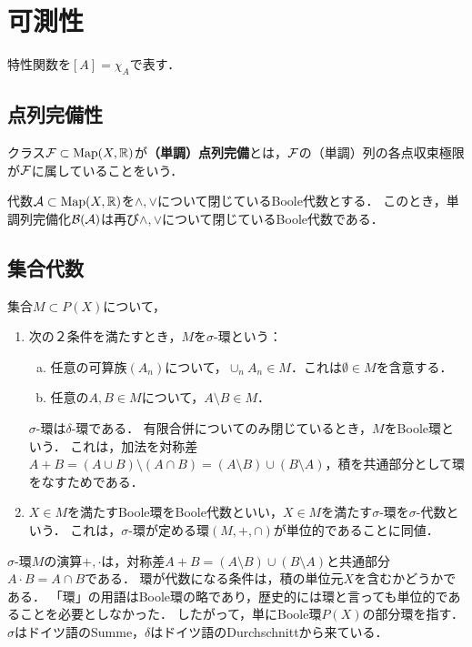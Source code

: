 \documentclass[uplatex,dvipdfmx]{jsreport}
\begin{document}
\section{可測性}

\begin{notation}
    特性関数を$[A]=\chi_A$で表す．
\end{notation}

\subsection{点列完備性}

\begin{definition}
    クラス$\mathcal{F}\subset\mathrm{Map}(X,\mathbb{R})$が\textbf{（単調）点列完備}とは，$\mathcal{F}$の（単調）列の各点収束極限が$\mathcal{F}$に属していることをいう．
\end{definition}

\begin{lemma}\label{lemma-sequential-completion}
    代数$\mathcal{A}\subset\mathrm{Map}(X,\mathbb{R})$を$\land,\lor$について閉じているBoole代数とする．
    このとき，単調列完備化$\mathcal{B}(\mathcal{A})$は再び$\land,\lor$について閉じているBoole代数である．
\end{lemma}

\subsection{集合代数}

\begin{definition}
    集合$M\subset P(X)$について，
    \begin{enumerate}
        \item 次の２条件を満たすとき，$M$を$\sigma$-環という：
        \begin{enumerate}[(a)]
            \item 任意の可算族$(A_n)$について，$\cup_{n}A_n\in M$．これは$\emptyset\in M$を含意する．
            \item 任意の$A,B\in M$について，$A\setminus B\in M$．
        \end{enumerate}
        $\sigma$-環は$\delta$-環である．
        有限合併についてのみ閉じているとき，$M$をBoole環という．
        これは，加法を対称差$A+B=(A\cup B)\setminus(A\cap B)=(A\setminus B)\cup(B\setminus A)$，積を共通部分として環をなすためである．
        \item $X\in M$を満たすBoole環をBoole代数といい，$X\in M$を満たす$\sigma$-環を$\sigma$-代数という．
        これは，$\sigma$-環が定める環$(M,+,\cap)$が単位的であることに同値．
    \end{enumerate}
\end{definition}
\begin{remarks}
    $\sigma$-環$M$の演算$+,\cdot$は，対称差$A+B=(A\setminus B)\cup(B\setminus A)$と共通部分$A\cdot B=A\cap B$である．
    環が代数になる条件は，積の単位元$X$を含むかどうかである．
    「環」の用語はBoole環の略であり，歴史的には環と言っても単位的であることを必要としなかった．
    したがって，単にBoole環$P(X)$の部分環を指す．
    $\sigma$はドイツ語のSumme，$\delta$はドイツ語のDurchschnittから来ている．
\end{remarks}
\end{document}
